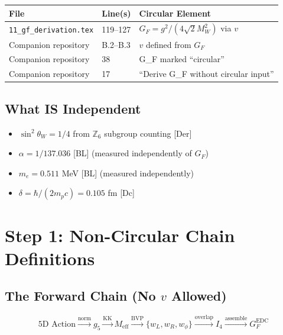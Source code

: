 \documentclass[11pt]{article}
\newcommand{\tagDer}{{\small\textsf{[Der]}}}
\newcommand{\tagDc}{{\small\textsf{[Dc]}}}
\newcommand{\tagBL}{{\small\textsf{[BL]}}}
\begin{document}
\begin{center}
\begin{tabular}{lll}
\toprule
\textbf{File} & \textbf{Line(s)} & \textbf{Circular Element} \\
\midrule
\texttt{11\_gf\_derivation.tex} & 119--127 & $G_F = g^2/(4\sqrt{2}M_W^2)$ via $v$ \\
Companion repository\footnotemark & B.2--B.3 & $v$ defined from $G_F$ \\
Companion repository\footnotemark[\value{footnote}] & 38 & G\_F marked ``circular'' \\
Companion repository\footnotemark[\value{footnote}] & 17 & ``Derive G\_F without circular input'' \\
\bottomrule
\end{tabular}
\end{center}

\subsection{What IS Independent}

\begin{itemize}
    \item $\sin^2\theta_W = 1/4$ from $\mathbb{Z}_6$ subgroup counting \tagDer{}
    \item $\alpha = 1/137.036$ \tagBL{} (measured independently of $G_F$)
    \item $m_e = 0.511$ MeV \tagBL{} (measured independently)
    \item $\delta = \hbar/(2m_p c) = 0.105$ fm \tagDc{}
\end{itemize}

\section{Step 1: Non-Circular Chain Definitions}

\subsection{The Forward Chain (No $v$ Allowed)}

\begin{tcolorbox}[colback=green!5!white, colframe=green!75!black, title=Non-Circular Derivation Chain]
\begin{equation}
\boxed{
\text{5D Action} \xrightarrow{\text{norm}} g_5
\xrightarrow{\text{KK}} M_{\text{eff}}
\xrightarrow{\text{BVP}} \{w_L, w_R, w_\phi\}
\xrightarrow{\text{overlap}} I_4
\xrightarrow{\text{assemble}} G_F^{\text{EDC}}
}
\end{equation}
\end{tcolorbox}
\end{document}
